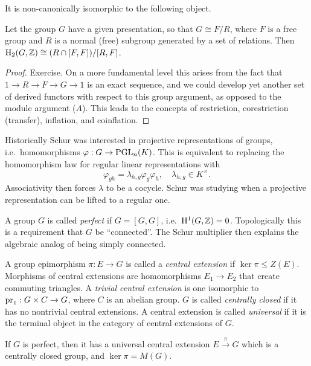 It is non-canonically isomorphic to the following object.

\begin{thm}
    Let the group $G$ have a given presentation, so that $G\cong F\slash R$, where $F$ is a free group and $R$ is a normal (free) subgroup generated by a set of relations. Then $\mathrm{H}_2(G,\mathbb{Z})\cong (R\cap [F,F])\slash [R,F]$.
\end{thm}
\begin{proof}
    Exercise. On a more fundamental level this arises from the fact that $1\to R\to F\to G\to 1$ is an exact sequence, and we could develop yet another set of derived functors with respect to this group argument, as opposed to the module argument ($A$). This leads to the concepts of restriction, corestriction (transfer), inflation, and coinflation.
\end{proof}

Historically Schur was interested in projective representations of groups, i.e.~homomorphisms $\varphi:G\to \operatorname{PGL}_n(K)$. This is equivalent to replacing the homomorphism law for regular linear representations with
\[\varphi_{gh}=\lambda_{h,g}\varphi_g\varphi_h,\quad\lambda_{h,g}\in K^\times.\]
Associativity then forces $\lambda$ to be a cocycle. Schur was studying when a projective representation can be lifted to a regular one. 

A group $G$ is called \emph{perfect} if $G=[G,G]$, i.e.~$\mathrm{H}^1(G,\mathbb{Z})=0$. Topologically this is a requirement that $G$ be ``connected''. The Schur multiplier then explains the algebraic analog of being simply connected. 

\begin{defn}
    A group epimorphism $\pi:E\to G$ is called a \emph{central extension} if $\ker\pi\leq Z(E)$.  Morphisms of central extensions are homomorphisms $E_1\to E_2$ that create commuting triangles. A \emph{trivial central extension} is one isomorphic to $\operatorname{pr}_1:G\times C\to G$, where $C$ is an abelian group. $G$ is called \emph{centrally closed} if it has no nontrivial central extensions. A central extension is called \emph{universal} if it is the terminal object in the category of central extensions of $G$.
\end{defn}

\begin{thm}[Schur]
    If $G$ is perfect, then it has a universal central extension $E\overset{\pi}{\to} G$ which is a centrally closed group, and $\ker\pi =M(G)$.
\end{thm}

